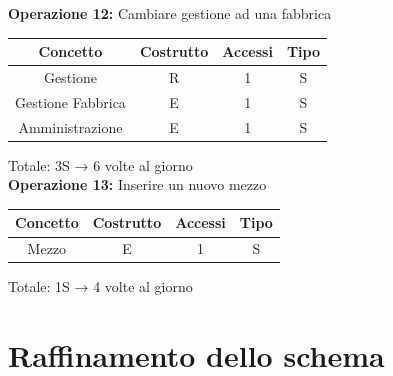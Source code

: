 \documentclass[a4paper,12pt]{report}
\begin{document}
\textbf{Operazione 12:}
Cambiare gestione ad una fabbrica\\
\begin{center}
    \begin{tabular}{ | c   c   c   c | } 
    \hline
	Concetto&Costrutto&Accessi&Tipo\\
	\hline
	Gestione&R&1&S\\
	\hline
    Gestione Fabbrica&E&1&S\\
	\hline
	Amministrazione&E&1&S\\
	\hline
	\end{tabular}
\end{center}
Totale: 3S → 6 volte al giorno\\
\textbf{Operazione 13:}
Inserire un nuovo mezzo\\
\begin{center}
    \begin{tabular}{ | c   c   c   c | } 
    \hline
	Concetto&Costrutto&Accessi&Tipo\\
	\hline
	Mezzo&E&1&S\\
	\hline
	\end{tabular}
\end{center}
Totale: 1S → 4 volte al giorno\\
\section{Raffinamento dello schema}
\end{document}
